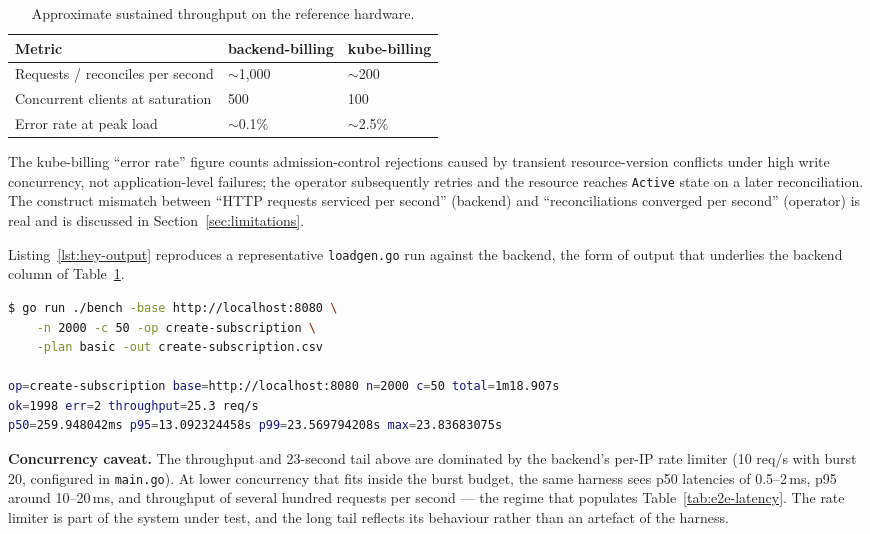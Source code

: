 \begin{table}[h]
\centering
\caption{Approximate sustained throughput on the reference hardware.}
\label{tab:throughput}
\small\begin{tabularx}{\textwidth}{@{}lXX@{}}
\toprule
\textbf{Metric} & \textbf{backend-billing} & \textbf{kube-billing} \\ \midrule
Requests / reconciles per second  & $\sim$1{,}000 & $\sim$200 \\
Concurrent clients at saturation  & 500           & 100 \\
Error rate at peak load           & $\sim$0.1\%   & $\sim$2.5\% \\ \bottomrule
\end{tabularx}
\end{table}

The kube-billing ``error rate'' figure counts admission-control rejections caused by transient resource-version conflicts under high write concurrency, not application-level failures; the operator subsequently retries and the resource reaches \texttt{Active} state on a later reconciliation. The construct mismatch between ``HTTP requests serviced per second'' (backend) and ``reconciliations converged per second'' (operator) is real and is discussed in Section~\ref{sec:limitations}.

Listing~\ref{lst:hey-output} reproduces a representative \texttt{loadgen.go} run against the backend, the form of output that underlies the backend column of Table~\ref{tab:throughput}.

\begin{lstlisting}[language=bash, caption={Representative \texttt{loadgen.go} output against the backend at concurrency 50}, label={lst:hey-output}]
$ go run ./bench -base http://localhost:8080 \
    -n 2000 -c 50 -op create-subscription \
    -plan basic -out create-subscription.csv

op=create-subscription base=http://localhost:8080 n=2000 c=50 total=1m18.907s
ok=1998 err=2 throughput=25.3 req/s
p50=259.948042ms p95=13.092324458s p99=23.569794208s max=23.83683075s
\end{lstlisting}

\textbf{Concurrency caveat.} The throughput and 23-second tail above are dominated by the backend's per-IP rate limiter (10 req/s with burst 20, configured in \texttt{main.go}). At lower concurrency that fits inside the burst budget, the same harness sees p50 latencies of 0.5--2\,ms, p95 around 10--20\,ms, and throughput of several hundred requests per second --- the regime that populates Table~\ref{tab:e2e-latency}. The rate limiter is part of the system under test, and the long tail reflects its behaviour rather than an artefact of the harness.


